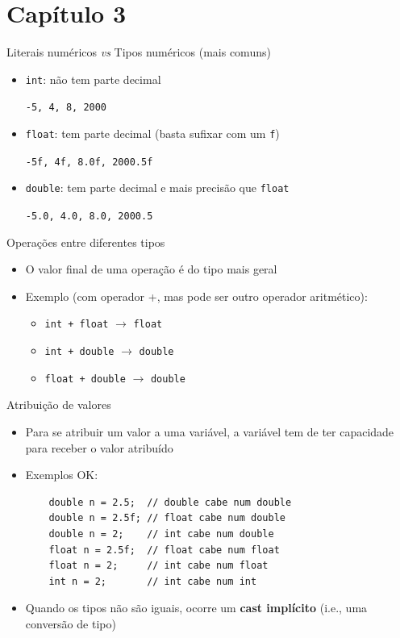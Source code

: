 \documentclass[portuguese, aspectratio=169, xcolor=table]{beamer}
\begin{document}
\section{Capítulo 3}
\begin{frame}{Literais numéricos \textit{vs} Tipos numéricos (mais comuns)}
\begin{itemize}
    \item \texttt{int}: não tem parte decimal
    
    \hspace{0.25cm}
    \texttt{-5, 4, 8, 2000}
    \item \texttt{float}: tem parte decimal (basta sufixar com um \texttt{f})
    
    \hspace{0.25cm}
    \texttt{-5f, 4f, 8.0f, 2000.5f}
    \item \texttt{double}: tem parte decimal e mais precisão que \texttt{float}
    
    \hspace{0.25cm}
    \texttt{-5.0, 4.0, 8.0, 2000.5}
\end{itemize}
\end{frame}

\begin{frame}{Operações entre diferentes tipos}
\begin{itemize}
    \item O valor final de uma operação é do tipo mais geral
    \item Exemplo (com operador +, mas pode ser outro operador aritmético): 
    \begin{itemize}
        \item \texttt{int + float} $\rightarrow$ \texttt{float}
        \item \texttt{int + double} $\rightarrow$ \texttt{double}
        \item \texttt{float + double} $\rightarrow$ \texttt{double}
    \end{itemize}
\end{itemize}
\end{frame}

\begin{frame}[fragile]{Atribuição de valores}
\begin{itemize}
\item Para se atribuir um valor a uma variável, a variável tem de ter capacidade para receber o valor atribuído
\item Exemplos OK:
\begin{verbatim}
    double n = 2.5;  // double cabe num double
    double n = 2.5f; // float cabe num double
    double n = 2;    // int cabe num double
    float n = 2.5f;  // float cabe num float
    float n = 2;     // int cabe num float
    int n = 2;       // int cabe num int
\end{verbatim}
\item Quando os tipos não são iguais, ocorre um \textbf{cast implícito} (i.e., uma conversão de tipo)
\end{itemize}
\end{frame}
\end{document}
